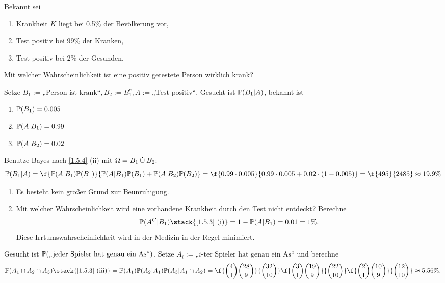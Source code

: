 \begin{ex} \label{1.5.5}
	Bekannt sei
	\begin{enumerate}[1)]
		\item
			Krankheit $K$ liegt bei 0.5\% der Bevölkerung vor,
		\item
			Test positiv bei 99\% der Kranken,
		\item
			Test positiv bei 2\% der Gesunden.
	\end{enumerate}
	Mit welcher Wahrscheinlichkeit ist eine positiv getestete Person wirklich krank?

	Setze $B_1 := \text{„Person ist krank“}, B_2 := B_1^c, A := \text{„Test positiv“}$.
	Gesucht ist $\P(B_1 | A)$, bekannt ist
	\begin{enumerate}[1)]
		\item
			$\P(B_1) = 0.005$
		\item
			$\P(A|B_1) = 0.99$
		\item
			$\P(A|B_2) = 0.02$
	\end{enumerate}
	Benutze Bayes nach \ref{1.5.4} (ii) mit $\Omega = B_1 \dunion B_2$:
	\[
		\P(B_1|A)
		= \f {\P(A|B_1) \P(B_1)}{\P(A|B_1) \P(B_1) + \P(A|B_2) \P(B_2)}
		= \f {0.99 \cdot 0.005}{0.99 \cdot 0.005 + 0.02 \cdot (1-0.005)}
		= \f {495}{2485}
		\approx 19.9 \%
	\]
	\begin{nt}
		\begin{enumerate}[1)]
			\item
				Es besteht kein großer Grund zur Beunruhigung.
			\item
				Mit welcher Wahrscheinlichkeit wird eine vorhandene Krankheit durch den Test nicht entdeckt?
				Berechne
				\[
					\P(A^C | B_1)
					\stack{\text{\ref{1.5.3} (i)}} = 1 - \P(A | B_1)
					= 0.01
					= 1 \%.
				\]
				Diese Irrtumswahrscheinlichkeit wird in der Medizin in der Regel minimiert.
		\end{enumerate}
	\end{nt}
\end{ex}

\begin{ex}[Skat] \label{1.5.6}
	Gesucht ist $\P(\text{„jeder Spieler hat genau ein As“})$.
	Setze $A_i := \text{„$i$-ter Spieler hat genau ein As“}$ und berechne
	\[
		\P(A_1 \cap A_2 \cap A_3)
		\stack{\text{\ref{1.5.3} (iii)}} = \P(A_1) \P(A_2 | A_1) \P(A_3 | A_1 \cap A_2)
		= \f {\binom{4}{1} \binom{28}{9}}{\binom{32}{10}} \f {\binom{3}{1} \binom{19}{9}}{\binom{22}{10}} \f {\binom{2}{1}\binom{10}{9}}{\binom{12}{10}}
		\approx 5.56 \%.
	\]
\end{ex}

